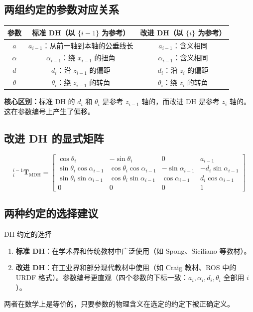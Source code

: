\subsection{两组约定的参数对应关系}

\begin{center}
	\begin{tabular}{ccc}
		\toprule
		参数 & 标准 DH（以 $\{i-1\}$ 为参考） & 改进 DH（以 $\{i\}$ 为参考） \\
		\midrule
		$a$ & $a_{i-1}$：从前一轴到本轴的公垂线长 & $a_{i-1}$：含义相同 \\
		$\alpha$ & $\alpha_{i-1}$：绕 $x_{i-1}$ 的扭角 & $\alpha_{i-1}$：含义相同 \\
		$d$ & $d_i$：沿 $z_{i-1}$ 的偏距 & $d_i$：沿 $z_i$ 的偏距 \\
		$\theta$ & $\theta_i$：绕 $z_{i-1}$ 的转角 & $\theta_i$：绕 $z_i$ 的转角 \\
		\bottomrule
	\end{tabular}
\end{center}

\textbf{核心区别：}标准 DH 的 $d_i$ 和 $\theta_i$ 是参考 $z_{i-1}$ 轴的，而改进 DH 是参考 $z_i$ 轴的。这在参数编号上产生了偏移。

\subsection{改进 DH 的显式矩阵}

\[
{}^{i-1}_{i}\mathbf{T}_{\text{MDH}} = \begin{bmatrix}
	\cos\theta_i & -\sin\theta_i & 0 & a_{i-1} \\
	\sin\theta_i\cos\alpha_{i-1} & \cos\theta_i\cos\alpha_{i-1} & -\sin\alpha_{i-1} & -d_i\sin\alpha_{i-1} \\
	\sin\theta_i\sin\alpha_{i-1} & \cos\theta_i\sin\alpha_{i-1} &  \cos\alpha_{i-1} &  d_i\cos\alpha_{i-1} \\
	0 & 0 & 0 & 1
\end{bmatrix}
\]

\subsection{两种约定的选择建议}

\begin{myTheorem}{DH 约定的选择}
	\begin{enumerate}
		\item \textbf{标准 DH}：在学术界和传统教材中广泛使用（如 Spong、Siciliano 等教材）。
		\item \textbf{改进 DH}：在工业界和部分现代教材中使用（如 Craig 教材、ROS 中的 URDF 格式）。参数编号更直观（四个参数的下标一致：$a_i, \alpha_i, d_i, \theta_i$ 全部用 $i$）。
	\end{enumerate}
	
	两者在数学上是等价的，只要参数的物理含义在选定的约定下被正确定义。
\end{myTheorem}

